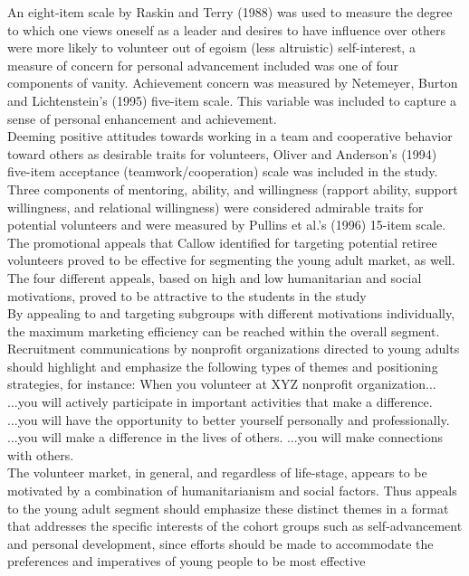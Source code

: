\documentclass[11pt,fleqn]{book} %
\begin{document}
An eight-item scale by Raskin and
Terry (1988) was used to measure the degree to which one views oneself as
a leader and desires to have influence over others\\

were more likely to volunteer out of egoism (less altruistic)
self-interest, a measure of concern for personal advancement included was
one of four components of vanity. Achievement concern was measured by
Netemeyer, Burton and Lichtenstein’s (1995) five-item scale. This variable
was included to capture a sense of personal enhancement and achievement.\\

Deeming positive attitudes towards working in a team and cooperative
behavior toward others as desirable traits for volunteers, Oliver and
Anderson’s (1994) five-item acceptance (teamwork/cooperation) scale was
included in the study.\\

Three components of mentoring, ability, and willingness (rapport
ability, support willingness, and relational willingness) were considered
admirable traits for potential volunteers and were measured by Pullins et al.’s
(1996) 15-item scale.\\

The promotional appeals that Callow identified for targeting potential retiree
volunteers proved to be effective for segmenting the young adult market, as
well. The four different appeals, based on high and low humanitarian and
social motivations, proved to be attractive to the students in the study\\

By appealing to and targeting subgroups with different motivations
individually, the maximum marketing efficiency can be reached within the
overall segment. Recruitment communications by nonprofit organizations
directed to young adults should highlight and emphasize the following types
of themes and positioning strategies, for instance:
When you volunteer at XYZ nonprofit organization...
...you will actively participate in important activities that make a
difference.
...you will have the opportunity to better yourself personally and
professionally.
...you will make a difference in the lives of others.
...you will make connections with others.\\

The volunteer market, in general, and regardless of life-stage, appears
to be motivated by a combination of humanitarianism and social factors.
Thus appeals to the young adult segment should emphasize these distinct
themes in a format that addresses the specific interests of the cohort groups
such as self-advancement and personal development, since efforts should be
made to accommodate the preferences and imperatives of young people to
be most effective\\
\end{document}
